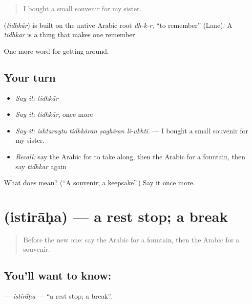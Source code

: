 \begin{quote}
I bought a small souvenir for my sister.
\end{quote}

\begin{cousinweb}
\textbf{} (\emph{tidhkār}) is built on the native Arabic root \emph{dh-k-r}, \textquotedblleft{}to remember\textquotedblright{} (Lane). A \emph{tidhkār} is a thing that makes one remember.
\end{cousinweb}

\begin{grammarlens}[title={What you've built}]
One more word for getting around.
\end{grammarlens}

\subsection*{Your turn}
\begin{itemize}
\raggedright
  \item \emph{Say it:} \emph{tidhkār}
  \item \emph{Say it:} \emph{tidhkār}, once more
  \item \emph{Say it:} \emph{ishtaraytu tidhkāran ṣaghīran li-ukhtī.} — I bought a small souvenir for my sister.
  \item \emph{Recall:} say the Arabic for to take along, then the Arabic for a fountain, then say \emph{tidhkār} again
\end{itemize}

\begin{tcolorbox}[breakable,colback=teal!4,colframe=teal!35!black,title={Before you move on}]
What does  mean? (\textquotedblleft{}A souvenir; a keepsake\textquotedblright{}.) Say it once more.
\end{tcolorbox}
\section[\texorpdfstring{\ar{استراحة} (istirāḥa)}{استراحة (istirāḥa)}]{ (istirāḥa) — a rest stop; a break}

\label{lesson:AR-C440-istiraha}



\begin{quote}
Before the new one: say the Arabic for a fountain, then the Arabic for a souvenir.
\end{quote}

\subsection*{You'll want to know: }
\textbf{} — \emph{istirāḥa} — \textquotedblleft{}a rest stop; a break\textquotedblright{}.

